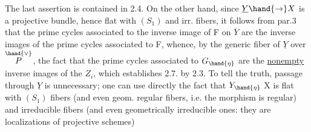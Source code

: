The last assertion is contained in 2.4. On the other hand, since
$\underline{Y} \hand{\rightarrow} X$ is a projective bundle, hence flat with $(S_1)$ and irr. fibers, it follows
from par.3 that the prime cycles associated to the inverse image  of F on
$\overline{Y}$ are the inverse images  of the prime cycles associated to F,
whence, by   the generic fiber  of $\underline{Y}$ over $\overset{\hand{\vee}}{P}$, the fact that the
prime cycles associated to $G_{\hand{\eta}}$ are the \uline{nonempty} inverse images of the $Z_i$,
which establishes 2.7. by 2.3. To tell the truth, passage through $\underline{Y}$ is
unnecessary; one can use directly the fact that $Y_{\hand{\eta}}$ \hand{$\longrightarrow$} X is flat with
$(S_1)$ fibers (and even geom. regular fibers, i.e. the morphism is regular)
and irreducible fibers (and even geometrically irreducible ones: they are
localizations of projective schemes)\hand{;} 


